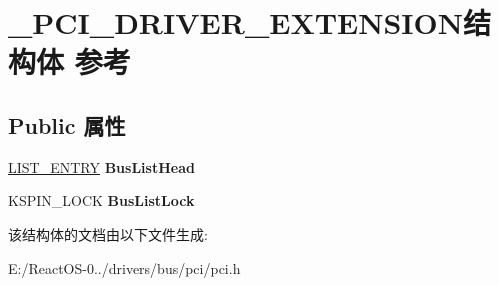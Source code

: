 \hypertarget{struct___p_c_i___d_r_i_v_e_r___e_x_t_e_n_s_i_o_n}{}\section{\+\_\+\+P\+C\+I\+\_\+\+D\+R\+I\+V\+E\+R\+\_\+\+E\+X\+T\+E\+N\+S\+I\+O\+N结构体 参考}
\label{struct___p_c_i___d_r_i_v_e_r___e_x_t_e_n_s_i_o_n}
\subsection*{Public 属性}
\begin{DoxyCompactItemize}
\item 
\mbox{\label{struct___p_c_i___d_r_i_v_e_r___e_x_t_e_n_s_i_o_n_a96dce91a6c56999b0c188b0f821694d6}} 
\hyperlink{struct___l_i_s_t___e_n_t_r_y}{L\+I\+S\+T\+\_\+\+E\+N\+T\+RY} {\bfseries Bus\+List\+Head}
\item 
\mbox{\label{struct___p_c_i___d_r_i_v_e_r___e_x_t_e_n_s_i_o_n_a3d62ac9ff5b0ecc6aa2629bd761bc99f}} 
K\+S\+P\+I\+N\+\_\+\+L\+O\+CK {\bfseries Bus\+List\+Lock}
\end{DoxyCompactItemize}


该结构体的文档由以下文件生成\+:\begin{DoxyCompactItemize}
\item 
E\+:/\+React\+O\+S-\/0../drivers/bus/pci/pci.\+h\end{DoxyCompactItemize}
